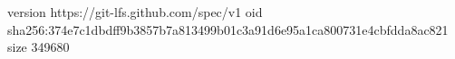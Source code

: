 version https://git-lfs.github.com/spec/v1
oid sha256:374e7c1dbdff9b3857b7a813499b01c3a91d6e95a1ca800731e4cbfdda8ac821
size 349680
